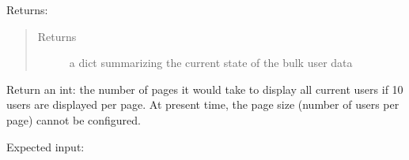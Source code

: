 \documentclass[letterpaper,10pt,english]{sphinxmanual}
\begin{document}
\begin{fulllineitems}
\begin{fulllineitems}
Returns:

\begin{sphinxVerbatim}[commandchars=\\\{\}]
         
         
         
         
\end{sphinxVerbatim}
\begin{quote}\begin{description}
\item[{Returns}] \leavevmode
a dict summarizing the current state of the bulk user data

\end{description}\end{quote}

\end{fulllineitems}


\begin{fulllineitems}
\label{\detokenize{apidoc/utdesign_procurement:utdesign_procurement.apigateway.ApiGateway.userSpreadsheetPages}}
Return an int: the number of pages it would take to
display all current users if 10 users are displayed
per page. At present time, the page size (number of
users per page) cannot be configured.

Expected input:


\end{fulllineitems}
\end{fulllineitems}
\end{document}
